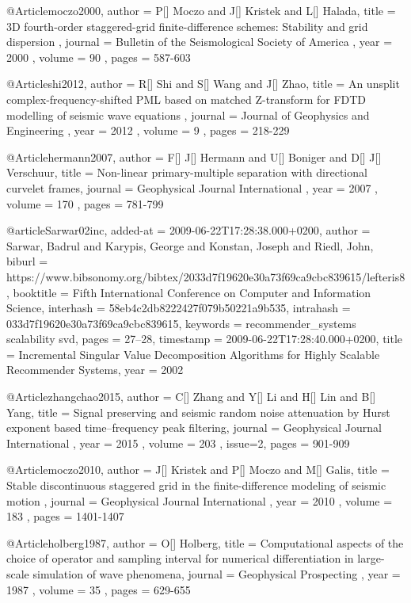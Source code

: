 @Article{moczo2000,
 author =  {  P[] Moczo and J[] Kristek and L[] Halada},
 title =   { 3{D} fourth-order staggered-grid finite-difference schemes: Stability and grid dispersion },
 journal = { Bulletin of the Seismological Society of America },
 year =    { 2000 },
 volume =  { 90 },
 pages =   { 587-603 }
}


@Article{shi2012,
 author =  {  R[] Shi and S[] Wang and J[] Zhao},
 title =   {An unsplit complex-frequency-shifted PML based on matched Z-transform for FDTD modelling of seismic wave equations },
 journal = { Journal of Geophysics and Engineering },
 year =    { 2012 },
 volume =  { 9 },
 pages =   { 218-229 }
}

@Article{hermann2007,
 author =  {  F[] J[] Hermann and U[] Boniger and D[] J[] Verschuur},
 title =   {Non-linear primary-multiple separation with directional curvelet frames},
 journal = { Geophysical Journal International },
 year =    { 2007 },
 volume =  { 170 },
 pages =   { 781-799 }
}

@article{Sarwar02inc,
  added-at = {2009-06-22T17:28:38.000+0200},
  author = {Sarwar, Badrul and Karypis, George and Konstan, Joseph and Riedl, John},
  biburl = {https://www.bibsonomy.org/bibtex/2033d7f19620e30a73f69ca9cbc839615/lefteris8},
  booktitle = {Fifth International Conference on Computer and Information Science},
  interhash = {58eb4c2db8222427f079b50221a9b535},
  intrahash = {033d7f19620e30a73f69ca9cbc839615},
  keywords = {recommender_systems scalability svd},
  pages = {27--28},
  timestamp = {2009-06-22T17:28:40.000+0200},
  title = {Incremental Singular Value Decomposition Algorithms for Highly Scalable
	Recommender Systems},
  year = 2002
}

@Article{zhangchao2015,
 author =  {  C[] Zhang and Y[] Li and H[] Lin and B[] Yang},
 title =   {Signal preserving and seismic random noise attenuation by Hurst exponent based time–frequency peak filtering},
 journal = { Geophysical Journal International },
 year =    { 2015 },
 volume =  { 203 },
 issue=2,
 pages =   { 901-909 }
}



@Article{moczo2010,
 author =  {  J[] Kristek and P[] Moczo and M[] Galis},
 title =   {Stable discontinuous staggered grid in the finite-difference modeling of seismic motion },
 journal = { Geophysical Journal International },
 year =    { 2010 },
 volume =  { 183 },
 pages =   { 1401-1407 }
}

@Article{holberg1987,
 author =  { O[] Holberg},
 title =   {Computational aspects of the choice of operator and sampling interval for numerical differentiation in large-scale simulation of wave phenomena},
 journal = { Geophysical Prospecting },
 year =    { 1987 },
 volume =  { 35 },
 pages =   { 629-655 }
}

